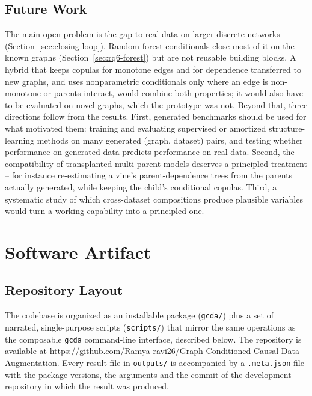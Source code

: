 \documentclass[
  english,
  class=report,
  accentcolor=2c,
  marginpar=false,
  parskip=half-,
  fontsize=11pt,
  ruledheaders=false,
  pdfa=false,
  IMRAD=false,
  thesis={type=master}
]{tudapub}
\begin{document}
\section{Future Work}
The main open problem is the gap to real data on larger discrete networks
(Section~\ref{sec:closing-loop}). Random-forest conditionals close most of
it on the known graphs (Section~\ref{sec:rq6-forest}) but are not reusable
building blocks. A hybrid that keeps copulas for monotone edges and for
dependence transferred to new graphs, and uses nonparametric conditionals
only where an edge is non-monotone or parents interact, would combine both
properties; it would also have to be evaluated on novel graphs, which the
prototype was not. Beyond that,
three directions follow from the results. First, generated benchmarks should be used for what motivated
them: training and evaluating supervised or amortized structure-learning
methods on many generated (graph, dataset) pairs, and testing whether
performance on generated data predicts performance on real data. Second,
the compatibility of transplanted multi-parent models deserves a principled
treatment -- for instance re-estimating a vine's parent-dependence trees
from the parents actually generated, while keeping the child's conditional
copulas. Third, a systematic study of which cross-dataset compositions
produce plausible variables would turn a working capability into a
principled one.

\appendix
\chapter{Software Artifact}

\section{Repository Layout}
The codebase is organized as an installable package (\texttt{gcda/}) plus a
set of narrated, single-purpose scripts (\texttt{scripts/}) that mirror the
same operations as the composable \texttt{gcda} command-line interface,
described below. The repository is available at
\url{https://github.com/Ramya-ravi26/Graph-Conditioned-Causal-Data-Augmentation}.
Every result file in \texttt{outputs/} is accompanied by a
\texttt{.meta.json} file with the package versions, the arguments and the
commit of the development repository in which the result was produced.
\end{document}
